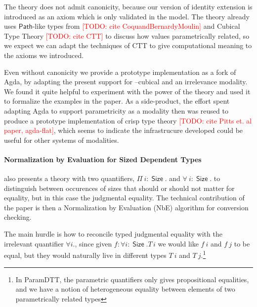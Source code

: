 \documentclass{book}
\newcommand{\TODO}[1]{\textcolor{red}{[TODO: #1]}}
\DeclareMathOperator{\Size}{\mathsf{Size}}
\newcommand{\sd}{.\,}
\begin{document}
The theory does not admit canonicity, because our version of identity
extension is introduced as an axiom which is only validated in the
model.  The theory already uses $\mathsf{Path}$-like types from
\TODO{cite CoquandBernardyMoulin} and Cubical Type Theory \TODO{cite
  CTT} to discuss how values parametrically related, so we expect we
can adapt the techniques of CTT to give computational meaning to the
axioms we introduced.

Even without canonicity we provide a prototype implementation as a
fork of Agda, by adapting the present support for --cubical and an
irrelevance modality. We found it quite helpful to experiment with the
power of the theory and used it to formalize the examples in the
paper. As a side-product, the effort spent adapting Agda to support
parametricity as a modality then was reused to produce a prototype
implementation of crisp type theory \TODO{cite Pitts et. al paper,
  agda-flat}, which seems to indicate the infrastrucure developed
could be useful for other systems of modalities.


\paragraph{Normalization by Evaluation for Sized Dependent Types}
also presents a theory with two quantifiers, $\Pi~i : \Size.$ and $\forall~i : \Size.$
to distinguish between occurences of sizes that should or should not
matter for equality, but in this case the judgmental equality.
The technical contribution of the paper is then a Normalization by
Evaluation (NbE) algorithm for conversion checking.

The main hurdle is how to reconcile typed judgmental equality with the
irrelevant quantifier $\forall i.$, since given $f : \forall i :
\Size. T\,i$ we would like $f~i$ and $f~j$ to be equal, but they would
naturally live in different types $T~i$ and $T~j$.\footnote{In ParamDTT, the parametric quantifiers only gives propositional equalities,
      and we have a notion of heterogeneous equality between elements of two
      parametrically related types}


\end{document}
